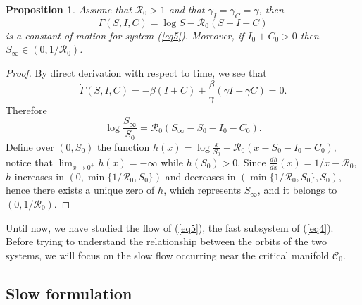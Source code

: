 \documentclass[11pt,reqno]{amsart}
\newtheorem{proposition}{Proposition}
\theoremstyle{boldremark}
\begin{document}
\begin{proposition}
    Assume that $\mathcal{R}_0>1$ and that $\gamma_I=\gamma_C=\gamma$, then 
    \begin{equation*}
        \Gamma(S,I,C)=\log{S} - \mathcal{R}_0 (S+I+C) 
    \end{equation*}
    is a constant of motion for system (\ref{eq5}). Moreover, if $I_0+C_0>0$ then $S_\infty \in (0, 1/\mathcal{R}_0)$. 
\end{proposition}
\begin{proof}
    By direct derivation with respect to time, we see that 
    \begin{equation*}
        \dot{\Gamma}(S,I,C)=-\beta(I+C) + \frac{\beta}{\gamma} (\gamma I +\gamma C) = 0. 
    \end{equation*}
    Therefore 
    \begin{equation*}
        \log{\frac{S_\infty}{S_0}} = \mathcal{R}_0 (S_\infty -S_0-I_0-C_0).  
    \end{equation*}
    Define over $(0, S_0)$ the function $h(x)=\log{\frac{x}{S_0}} - \mathcal{R}_0 (x -S_0-I_0-C_0)$, notice that $\lim_{x \to 0^+} h(x) = -\infty$ while $h(S_0)>0$. Since $\frac{dh}{dx}(x)=1/x - \mathcal{R}_0$, $h$ increases in $(0, \min \{1/\mathcal{R}_0, S_0\})$ and decreases in $(\min \{1/\mathcal{R}_0, S_0\}, S_0)$, hence there exists a unique zero of $h$, which represents $S_\infty$, and it belongs to $(0, 1/\mathcal{R}_0)$. 
\end{proof}

Until now, we have studied the flow of (\ref{eq5}), the fast subsystem of (\ref{eq4}). Before trying to understand the relationship between the orbits of the two systems, we will focus on the slow flow occurring near the critical manifold $\mathcal{C}_0$.

\subsection{Slow formulation} \label{sotto3}
\end{document}
